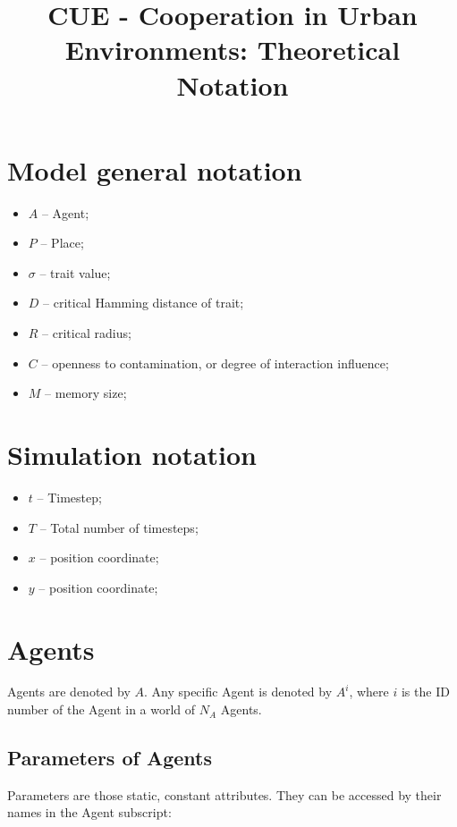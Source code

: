 \documentclass{article}
\title{CUE - Cooperation in Urban Environments: Theoretical Notation}
\author{}
\begin{document}
\maketitle

\section{Model general notation}

\begin{itemize}
    \item $A$ -- Agent;
    \item $P$ -- Place;
    \item $\sigma$ -- trait value;
    \item $D$ -- critical Hamming distance of trait;
    \item $R$ -- critical radius;
    \item $C$ -- openness to contamination, or degree of interaction influence;
    \item $M$ -- memory size;
    
\end{itemize}

\section{Simulation notation}

\begin{itemize}
    \item $t$ -- Timestep;
    \item $T$ -- Total number of timesteps;
    \item $x$ -- position coordinate;
    \item $y$ -- position coordinate;
\end{itemize}

\section{Agents}

\par Agents are denoted by $A$. Any specific Agent is denoted by $A^{i}$, where $i$ is the ID number of the Agent in a world of $N_A$ Agents.  

\subsection{Parameters of Agents}

\par Parameters are those static, constant attributes. They can be accessed by their names in the Agent subscript:
\end{document}
